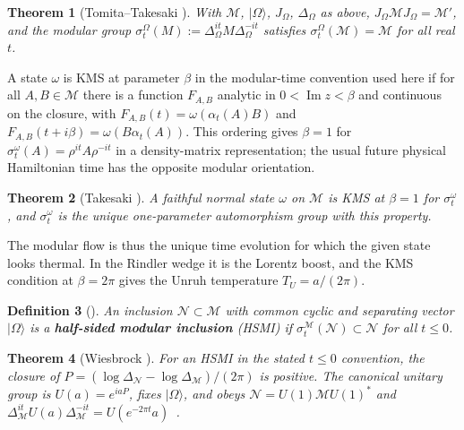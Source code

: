 \documentclass[12pt,a4paper]{article}
\newtheorem{theorem}{Theorem}[section]
\newtheorem{definition}[theorem]{Definition}
\begin{document}
\begin{theorem}[Tomita--Takesaki {\cite{Takesaki2003}}]
\label{thm:TT}
With $\mathcal M$, $|\Omega\rangle$, $J_\Omega$, $\Delta_\Omega$ as above, $J_\Omega \mathcal{M} J_\Omega = \mathcal{M}'$, and the modular group $\sigma_t^\Omega(M) := \Delta_\Omega^{it} M \Delta_\Omega^{-it}$ satisfies $\sigma_t^\Omega(\mathcal{M}) = \mathcal{M}$ for all real $t$.
\end{theorem}

A state $\omega$ is KMS at parameter $\beta$ in the modular-time convention used here
if for all $A,B\in\mathcal M$ there is a function $F_{A,B}$ analytic in
$0<\operatorname{Im}z<\beta$ and continuous on the closure, with
$F_{A,B}(t)=\omega(\alpha_t(A)B)$ and
$F_{A,B}(t+i\beta)=\omega(B\alpha_t(A))$. This ordering gives $\beta=1$ for
$\sigma_t^\omega(A)=\rho^{it}A\rho^{-it}$ in a density-matrix representation;
the usual future physical Hamiltonian time has the opposite modular orientation.

\begin{theorem}[Takesaki {\cite{Takesaki2003}}]
\label{thm:KMS-unique}
A faithful normal state $\omega$ on $\mathcal{M}$ is KMS at $\beta = 1$ for $\sigma_t^\omega$, and $\sigma_t^\omega$ is the unique one-parameter automorphism group with this property.
\end{theorem}

The modular flow is thus the unique time evolution for which the given state looks thermal. In the Rindler wedge it is the Lorentz boost, and the KMS condition at $\beta = 2\pi$ gives the Unruh temperature $T_U = a/(2\pi)$.

\begin{definition}[{\cite{Wiesbrock1993}}]
An inclusion $\mathcal{N} \subset \mathcal{M}$ with common cyclic and separating vector $|\Omega\rangle$ is a \textbf{half-sided modular inclusion} (HSMI) if $\sigma_t^{\mathcal{M}}(\mathcal{N}) \subset \mathcal{N}$ for all $t \leq 0$.
\end{definition}

\begin{theorem}[Wiesbrock {\cite{Wiesbrock1993}}]
\label{thm:Wiesbrock}
For an HSMI in the stated $t\le0$ convention, the closure of
$P=(\log\Delta_{\mathcal N}-\log\Delta_{\mathcal M})/(2\pi)$ is positive. The canonical
unitary group is $U(a)=e^{iaP}$, fixes $|\Omega\rangle$, and obeys
$\mathcal N=U(1)\mathcal M U(1)^*$ and
$\Delta_{\mathcal M}^{it}U(a)\Delta_{\mathcal M}^{-it}=U(e^{-2\pi t}a)$~\cite[Thm.~2.1]{ArakiZsido2005}.
\end{theorem}
\end{document}

